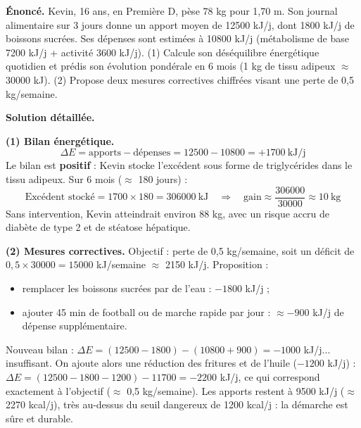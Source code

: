 \documentclass[11pt]{article}
\begin{document}
\begin{exoresolu}
\textbf{Énoncé.} Kevin, 16 ans, en Première D, pèse 78 kg pour 1,70 m. Son journal alimentaire sur 3 jours donne un apport moyen de \num{12500} kJ/j, dont \num{1800} kJ/j de boissons sucrées. Ses dépenses sont estimées à \num{10800} kJ/j (métabolisme de base \num{7200} kJ/j + activité \num{3600} kJ/j). (1) Calcule son déséquilibre énergétique quotidien et prédis son évolution pondérale en 6 mois (1 kg de tissu adipeux $\approx$ \num{30000} kJ). (2) Propose deux mesures correctives chiffrées visant une perte de 0,5 kg/semaine.

\tcblower
\textbf{Solution détaillée.}

\textbf{(1) Bilan énergétique.}
\[ \Delta E = \text{apports} - \text{dépenses} = 12500 - 10800 = +1700 \ \text{kJ/j} \]
Le bilan est \textbf{positif} : Kevin stocke l'excédent sous forme de triglycérides dans le tissu adipeux. Sur 6 mois ($\approx$ 180 jours) :
\[ \text{Excédent stocké} = 1700 \times 180 = \num{306000} \ \text{kJ} \quad\Rightarrow\quad \text{gain} \approx \frac{306000}{30000} \approx 10 \ \text{kg} \]
Sans intervention, Kevin atteindrait environ 88 kg, avec un risque accru de diabète de type 2 et de stéatose hépatique.

\textbf{(2) Mesures correctives.} Objectif : perte de 0,5 kg/semaine, soit un déficit de $0,5 \times 30000 = \num{15000}$ kJ/semaine $\approx$ \num{2150} kJ/j. Proposition :
\begin{itemize}
\item remplacer les boissons sucrées par de l'eau : $-1800$ kJ/j ;
\item ajouter 45 min de football ou de marche rapide par jour : $\approx -900$ kJ/j de dépense supplémentaire.
\end{itemize}
Nouveau bilan : $\Delta E = (12500 - 1800) - (10800 + 900) = -1000$ kJ/j... insuffisant. On ajoute alors une réduction des fritures et de l'huile ($-1200$ kJ/j) : $\Delta E = (12500 - 1800 - 1200) - 11700 = -2200$ kJ/j, ce qui correspond exactement à l'objectif ($\approx$ 0,5 kg/semaine). Les apports restent à \num{9500} kJ/j ($\approx$ \num{2270} kcal/j), très au-dessus du seuil dangereux de \num{1200} kcal/j : la démarche est sûre et durable.
\end{exoresolu}
\end{document}
